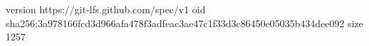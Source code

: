 version https://git-lfs.github.com/spec/v1
oid sha256:3a978166fcd3d966afa478f3adfeac3ae47c1f33d3c86450e05035b434dee092
size 1257
